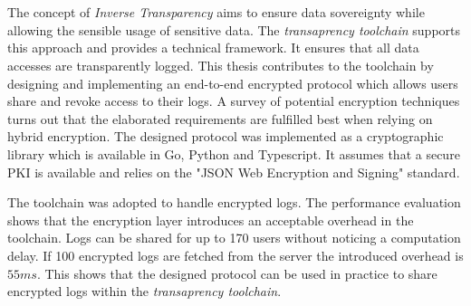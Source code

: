 \documentclass[../main.tex]{subfiles}
\begin{document}
\chapter*{\myAbstractTitle}

The concept of \emph{Inverse Transparency} aims to ensure data sovereignty while allowing the sensible usage of sensitive data.
The \emph{transaprency toolchain} supports this approach and provides a technical framework.
It ensures that all data accesses are transparently logged.
This thesis contributes to the toolchain by designing and implementing an end-to-end encrypted protocol which allows users share and revoke access to their logs.
A survey of potential encryption techniques turns out that the elaborated requirements are fulfilled best when relying on hybrid encryption.
The designed protocol was implemented as a cryptographic library which is available in Go, Python and Typescript.
It assumes that a secure PKI is available and relies on the "JSON Web Encryption and Signing" standard.

The toolchain was adopted to handle encrypted logs.
The performance evaluation shows that the encryption layer introduces an acceptable overhead in the toolchain.
Logs can be shared for up to 170 users without noticing a computation delay.
If 100 encrypted logs are fetched from the server the introduced overhead is $55ms$.
This shows that the designed protocol can be used in practice to share encrypted logs within the \emph{transaprency toolchain}.
\end{document}
